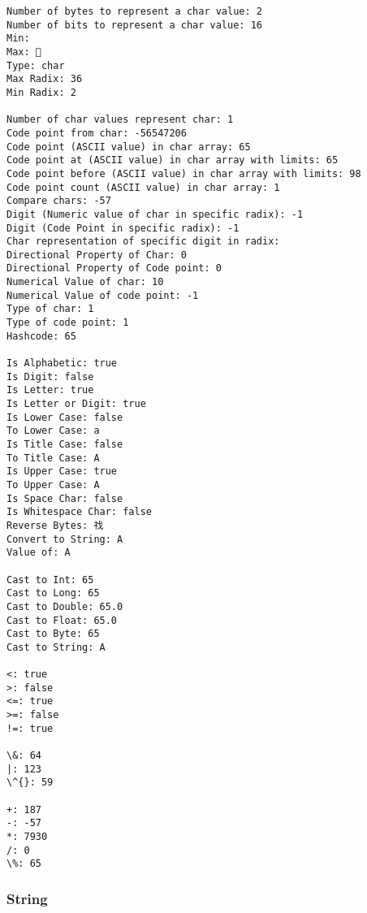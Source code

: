 \documentclass[11pt]{article}
\begin{document}
    \begin{Verbatim}[commandchars=\\\{\}]
Number of bytes to represent a char value: 2
Number of bits to represent a char value: 16
Min:  
Max: ￿
Type: char
Max Radix: 36
Min Radix: 2

Number of char values represent char: 1
Code point from char: -56547206
Code point (ASCII value) in char array: 65
Code point at (ASCII value) in char array with limits: 65
Code point before (ASCII value) in char array with limits: 98
Code point count (ASCII value) in char array: 1
Compare chars: -57
Digit (Numeric value of char in specific radix): -1
Digit (Code Point in specific radix): -1
Char representation of specific digit in radix:  
Directional Property of Char: 0
Directional Property of Code point: 0
Numerical Value of char: 10
Numerical Value of code point: -1
Type of char: 1
Type of code point: 1
Hashcode: 65

Is Alphabetic: true
Is Digit: false
Is Letter: true
Is Letter or Digit: true
Is Lower Case: false
To Lower Case: a
Is Title Case: false
To Title Case: A
Is Upper Case: true
To Upper Case: A
Is Space Char: false
Is Whitespace Char: false
Reverse Bytes: 䄀
Convert to String: A
Value of: A

Cast to Int: 65
Cast to Long: 65
Cast to Double: 65.0
Cast to Float: 65.0
Cast to Byte: 65
Cast to String: A

<: true
>: false
<=: true
>=: false
!=: true

\&: 64
|: 123
\^{}: 59

+: 187
-: -57
*: 7930
/: 0
\%: 65
    \end{Verbatim}

    \hypertarget{string}{%
\subsubsection{String}\label{string}}
\end{document}
